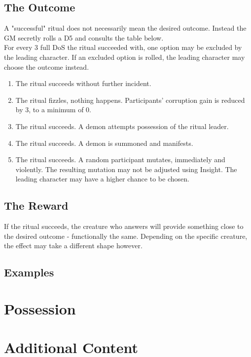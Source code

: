 \documentclass[12pt,a4paper,openany]{book}
\begin{document}
	\section{The Outcome}
	A "successful" ritual does not necessarily mean the desired outcome. Instead the GM secretly rolls a D5 and consults the table below.\\
	For every 3 full DoS the ritual succeeded with, one option may be excluded by the leading character. If an excluded option is rolled, the leading character may choose the outcome instead.
	\par
	\vspace{-5mm}
	\begin{enumerate}
		\raggedright
		\setlength\itemsep{-8mm}
		\item The ritual succeeds without further incident.
		\item The ritual fizzles, nothing happens. Participants' corruption gain is reduced by 3, to a minimum of 0.
		\item The ritual succeeds. A demon attempts possession of the ritual leader.
		\item The ritual succeeds. A demon is summoned and manifests.
		\item The ritual succeeds. A random participant mutates, immediately and violently. The resulting mutation may not be adjusted using Insight.
		The leading character may have a higher chance to be chosen.
	\end{enumerate}
	\section{The Reward}
	If the ritual succeeds, the creature who answers will provide something close to the desired outcome - functionally the same.
	Depending on the specific creature, the effect may take a different shape however.
	\section{Examples}
	
	
	\chapter{Possession}
	
	
	
	\chapter{Additional Content}
	
	
\end{document}
